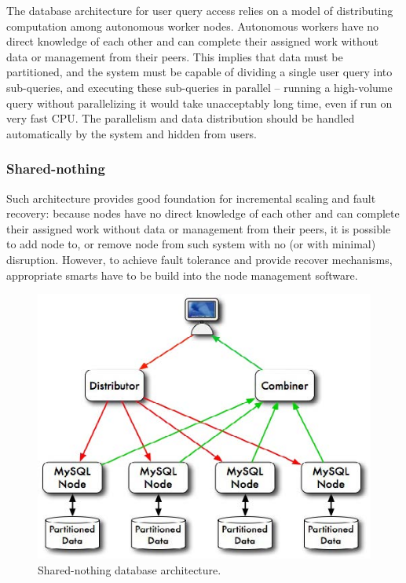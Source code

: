 \documentclass[DM,lsstdraft,toc]{lsstdoc}
\begin{document}
The database architecture for user query access relies on a model of
distributing computation among autonomous worker nodes. Autonomous
workers have no direct knowledge of each other and can complete their
assigned work without data or management from their peers. This implies
that data must be partitioned, and the system must be capable of
dividing a single user query into sub-queries, and executing these
sub-queries in parallel -- running a high-volume query without
parallelizing it would take unacceptably long time, even if run on very
fast CPU. The parallelism and data distribution should be handled
automatically by the system and hidden from users.

\subsubsection{Shared-nothing}\label{shared-nothing}

Such architecture provides good foundation for incremental scaling and
fault recovery: because nodes have no direct knowledge of each other and
can complete their assigned work without data or management from their
peers, it is possible to add node to, or remove node from such system
with no (or with minimal) disruption. However, to achieve fault
tolerance and provide recover mechanisms, appropriate smarts have to be
build into the node management software.

\begin{figure}[H]
\centering
\includegraphics{_static/shared_nothing_arch.jpg}
\caption{Shared-nothing database architecture.}
\end{figure}
\end{document}
